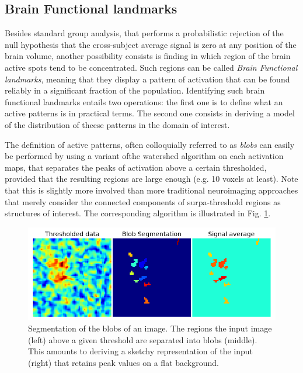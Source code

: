 \documentclass{bioinfo}
\begin{document}
\subsection{Brain Functional landmarks}

Besides standard group analysis, that performs a probabilistic
rejection of the null hypothesis that the cross-subject average signal
is zero at any position of the brain volume, another possibility
consists is finding in which region of the brain active spots tend to
be concentrated.
%
Such regions can be called \textit{Brain Functional landmarks},
meaning that they display a pattern of activation that can be found
reliably in a significant fraction of the population.
% 
Identifying such brain functional landmarks entails two operations:
the first one is to define what an active patterns is in practical
terms. The second one consists in deriving a model of the distribution
of theese patterns in the domain of interest.

The definition of active patterns, often colloquially referred to as
\textit{blobs} can easily be performed by using a variant ofthe
watershed algorithm on each activation maps, that separates the peaks
of activation above a certain thresholded, provided that the resulting
regions are large enough (e.g. 10 voxels at least).
%
Note that this is slightly more involved than more traditional
neuroimaging approaches that merely consider the connected components
of surpa-threshold regions as structures of interest.
%
The corresponding algorithm is illustrated in Fig. \ref{fig:watershed}.

\begin{figure}
\includegraphics[width=\linewidth]{Figures/blob}
\caption{Segmentation of the blobs of an image. The regions the input
  image (left) above a given threshold are separated into blobs
  (middle). This amounts to deriving a sketchy representation of the
  input (right) that retains peak values on a flat background.}
\label{fig:watershed}
\end{figure}
\end{document}
